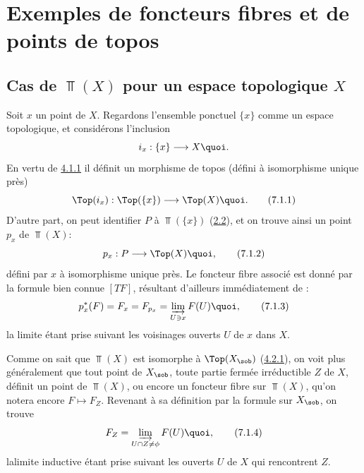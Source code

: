 \section{Exemples de foncteurs fibres et de points de topos}\pageoriginale

\subsection{Cas de $\Top(X)$ pour un espace topologique
  $X$}

Soit $x$ un point de $X$. Regardons l'ensemble ponctuel $\{x\}$
comme un espace topologique, et considérons l'inclusion
$$
i_x:\{x\}\longrightarrow X{\quoi}.
$$
En vertu de \hyperref[IV.subsubsec4.1.1]{4.1.1} il définit un morphisme de topos
(défini à isomorphisme unique près)
\begin{equation*}
\Top(i_x):\Top(\{x\})\longrightarrow \Top(X){\quoi}.\tag{7.1.1}
\end{equation*}
D'autre part, on peut identifier $P$ à $\Top(\{x\})$
(\hyperref[IV.subsec2.2]{2.2}), et on trouve ainsi un point $p_x$ de
$\Top(X)$:
\begin{equation*}
p_x:P\longrightarrow \Top(X){\quoi},\tag{7.1.2}
\end{equation*}
défini par $x$ à isomorphisme unique près. Le foncteur fibre associé
est donné par la formule bien connue $[TF]$, résultant d'ailleurs
immédiatement de :
\begin{equation*}
p^{\ast}_x(F)=F_x=F_{p_x}=\varinjlim_{U\ni x}F(U){\quoi},\tag{7.1.3}
\end{equation*}
la limite étant prise suivant les voisinages ouverts $U$ de $x$ dans
$X$.

Comme on sait que $\Top(X)$ est isomorphe à $\Top(X_{\sob})$
(\hyperref[IV.subsubsec4.2.1]{4.2.1}), on voit plus généralement que tout point
de $X_{\sob}$, \ie toute partie fermée irréductible $Z$ de $X$,
définit un point de $\Top(X)$, ou encore un foncteur fibre sur
$\Top(X)$, qu'on notera encore $F\mapsto F_Z$. Revenant à sa
définition par la formule  sur $X_{\sob}$, on trouve
\begin{equation*}
F_Z=\varinjlim_{U\cap Z\neq \phi} F(U){\quoi},\tag{7.1.4}
\end{equation*}
la\pageoriginale limite inductive étant prise suivant les ouverts
$U$ de $X$ qui rencontrent $Z$.

